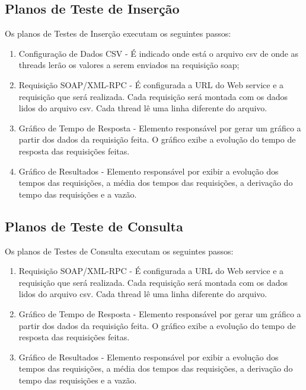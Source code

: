 \subsection{Planos de Teste de Inserção}

Os planos de Testes de Inserção executam os seguintes passos:

\begin{enumerate}
\item Configuração de Dados CSV - É indicado onde está o arquivo csv de onde as threads lerão os valores a serem enviados na requisição soap;
\item Requisição SOAP/XML-RPC - É configurada a URL do Web service e a requisição que será realizada. Cada requisição será montada com os dados lidos do arquivo csv. Cada thread lê uma linha diferente do arquivo.
\item Gráfico de Tempo de Resposta -  Elemento responsável por gerar um gráfico a partir dos dados da requisição feita. O gráfico exibe a  evolução do tempo de resposta das requisições feitas.
\item Gráfico de Resultados - Elemento responsável por exibir a evolução dos tempos das requisições, a média dos tempos das requisições, a derivação do tempo das requisições e a vazão.
\end{enumerate}

\subsection{Planos de Teste de Consulta}

Os planos de Testes de Consulta executam os seguintes passos:

\begin{enumerate}
\item Requisição SOAP/XML-RPC - É configurada a URL do Web service e a requisição que será realizada. Cada requisição será montada com os dados lidos do arquivo csv. Cada thread lê uma linha diferente do arquivo.
\item Gráfico de Tempo de Resposta -  Elemento responsável por gerar um gráfico a partir dos dados da requisição feita. O gráfico exibe a  evolução do tempo de resposta das requisições feitas.
\item Gráfico de Resultados - Elemento responsável por exibir a evolução dos tempos das requisições, a média dos tempos das requisições, a derivação do tempo das requisições e a vazão.
\end{enumerate}